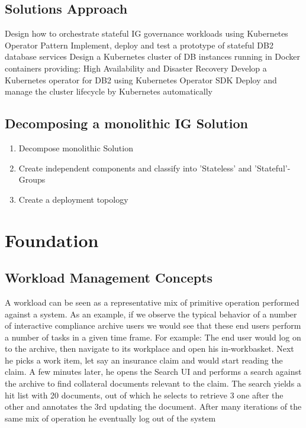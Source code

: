 \documentclass[runningheads]{llncs}
\begin{document}
\subsection{ Solutions Approach}

Design how to orchestrate stateful IG governance workloads using Kubernetes Operator Pattern Implement, deploy and test a prototype of stateful DB2 database services Design a Kubernetes cluster of DB instances running in Docker containers providing:
High Availability and Disaster Recovery
Develop a Kubernetes operator for DB2 using Kubernetes Operator SDK
Deploy and manage the cluster lifecycle by Kubernetes automatically

\subsection{ Decomposing a monolithic IG Solution  }

\begin{enumerate}
    \item Decompose monolithic Solution
    \item Create independent components and classify into 'Stateless' and 'Stateful'-Groups 
    \item Create a deployment topology 
\end{enumerate}

\section{Foundation}

\subsection{Workload Management Concepts}
A workload can be seen as a representative mix of primitive operation performed against a system. As an example, if we observe the typical behavior of a number of interactive compliance archive users we would see that these end users perform a number of tasks in a given time frame. For example: The end user would log on to the archive, then navigate to its workplace and open his in-workbasket. Next he picks a work item, let say an insurance claim and would start reading the claim. A few minutes later, he opens the Search UI and performs a search against the archive to find collateral documents relevant to the claim. The search yields a hit list with 20 documents, out of which he selects to retrieve 3 one after the other and annotates the 3rd updating the document. After many iterations of the same mix of operation he eventually log out of the system       
\end{document}
